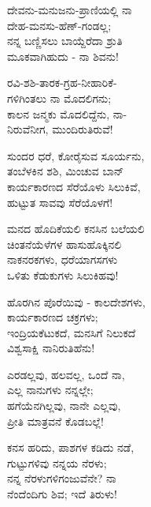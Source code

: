 \begin{myquote}
ದೇವನು-ಮನುಜನು-ಪ್ರಾಣಿಯಲ್ಲಿ ನಾ\\ದೇಹ-ಮನಸು-ಹೆಣ್-ಗಂಡಲ್ಲ;\\ನನ್ನ ಬಣ್ಣಿಸಲು ಬಾಯ್ದೆರೆದಾ ಶ್ರುತಿ\\ಮೂಕವಾಗಿಹುದು - ನಾ ಶಿವನು!
\end{myquote}

\begin{myquote}
ರವಿ-ಶಶಿ-ತಾರಕ-ಗ್ರಹ-ನೀಹಾರಿಕೆ-\\ಗಳಿಗಿಂತಲು ನಾ ಮೊದಲಿಗನು;\\ಕಾಲನ ಜನ್ಮಕು ಮೊದಲಿದ್ದೆನು, ನಾ-\\ನಿರುವೆನೀಗ, ಮುಂದಿರುತಿರುವೆ!
\end{myquote}

\begin{myquote}
ಸುಂದರ ಧರೆ, ಕೋರೈಸುವ ಸೂರ್ಯನು,\\ತಂಬೆಳಕಿನ ಶಶಿ, ಮಿಂಚುವ ಬಾನ್\\ಕಾರ್ಯಕಾರಣದ ಸೆರೆಯೊಳು ಸಿಲುಕಿವೆ,\\ಹುಟ್ಟುತ ಸಾವವು ಸೆರೆಯೊಳಗೆ!
\end{myquote}

\begin{myquote}
ಮನದ ಹೊದಿಕೆಯಲಿ ಕನಸಿನ ಬಲೆಯಲಿ\\ಚಿಂತನೆಯೆಳೆಗಳ ಹಾಸುಹೊಕ್ಕಿನಲಿ\\ನಾಕನರಕಗಳು, ಧರೆಯಾಗಸಗಳು\\ಒಳಿತು ಕೆಡುಕುಗಳು ಸಿಲುಕಿಹವು!
\end{myquote}

\begin{myquote}
ಹೊರಗಿನ ಪೊರೆಯಿವು - ಕಾಲದೇಶಗಳು,\\ಕಾರ್ಯಕಾರಣದ ಚಕ್ರಗಳು;\\ಇಂದ್ರಿಯಕೆಟುಕದೆ, ಮನಸಿಗೆ ನಿಲುಕದೆ\\ವಿಶ್ವಸಾಕ್ಷಿ ನಾನಿರುತಿಹೆನು!
\end{myquote}

\begin{myquote}
ಎರಡಲ್ಲವು, ಹಲವಲ್ಲ, ಒಂದೆ ನಾ,\\ಎಲ್ಲ ನಾನುಗಳು ನನ್ನಲ್ಲೇ;\\ಹಗೆಯೆನಗಿಲ್ಲವು, ನಾನೇ ಎಲ್ಲವು,\\ಪ್ರೀತಿ ಮಾತ್ರವನೆ ಕೊಡಬಲ್ಲೆ!
\end{myquote}

\begin{myquote}
ಕನಸ ಹರಿದು, ಪಾಶಗಳ ಕಡಿದು ನಡೆ,\\ಗುಟ್ಟುಗಳಿವು ನನ್ನಯ ನೆರಳು;\\ನನ್ನ ನೆರಳುಗಳಿಗಂಜುವೆನೇ? ನಾ\\ನೆಂದೆಂದಿಗು ಶಿವ; ಇದೆ ತಿರುಳು!
\end{myquote}

